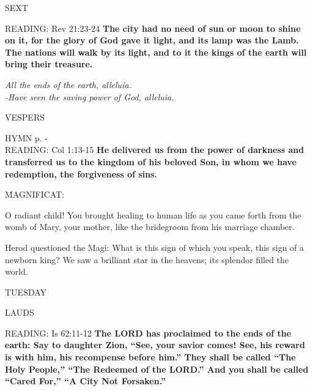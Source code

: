 \begin{flushleft}\normalsize{\uppercase{SEXT\\}}\end{flushleft}
\noindent\small{\uppercase{READING:}}    Rev 21:23-24 \textbf{   The city had no need of sun or moon to shine on it, for the glory of God gave it light, and its lamp was the Lamb. The nations will walk by its light, and to it the kings of the earth will bring their treasure.}
\begin{center}\textit{All the ends of the earth, alleluia.\\
-Have seen the saving power of God, alleluia.}\end{center}

\begin{flushleft}\normalsize{\uppercase{VESPERS\\}}\end{flushleft}
\small{\uppercase{HYMN} p. \pageref{christmas:firstHymn}-\pageref{christmas:lastHymn}\\}
\noindent\small{\uppercase{READING:}}    Col 1:13-15 \textbf{   He delivered us from the power of darkness and transferred us to the kingdom of his beloved Son, in whom we have redemption, the forgiveness of sins.\\}

\noindent\small{\uppercase{MAGNIFICAT:}}\begin{description}[labelindent=\parindent, leftmargin=*]
\item [(before the Epiphany)] O radiant child! You brought healing to human life as you came forth from the womb of Mary, your mother, like the bridegroom from his marriage chamber.
\item [(Wednesday after the Epiphany)]Herod questioned the Magi: What is this sign of which you speak, this sign of a newborn king? We saw a brilliant star in the heavens; its splendor filled the world.

\end{description}


\begin{center}
 \normalsize TUESDAY
\end{center}


\begin{flushleft}\normalsize{\uppercase{LAUDS\\}}\end{flushleft}
\noindent\small{\uppercase{READING:}}    Is 62:11-12 \textbf{   The LORD has proclaimed to the ends of the earth: Say to daughter Zion, “See, your savior comes! See, his reward is with him, his recompense before him.” They shall be called “The Holy People,” “The Redeemed of the LORD.” And you shall be called “Cared For,” “A City Not Forsaken.”\\}

